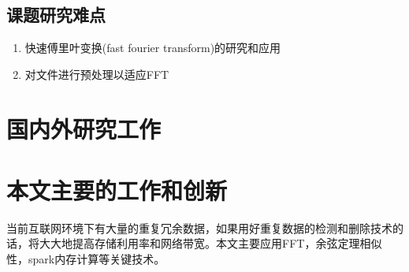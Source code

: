 \subsection{课题研究难点}
\label{sec:point2}

\begin{enumerate}
\item 快速傅里叶变换(fast fourier transform)的研究和应用

\item 对文件进行预处理以适应FFT

\end{enumerate}

\section{国内外研究工作}
\label{sec:relatedwork}

\section{本文主要的工作和创新}
\label{sec:relatedwork}

当前互联网环境下有大量的重复冗余数据，如果用好重复数据的检测和删除技术的话，将大大地提高存储利用率和网络带宽。本文主要应用FFT，余弦定理相似性，spark内存计算等关键技术。
